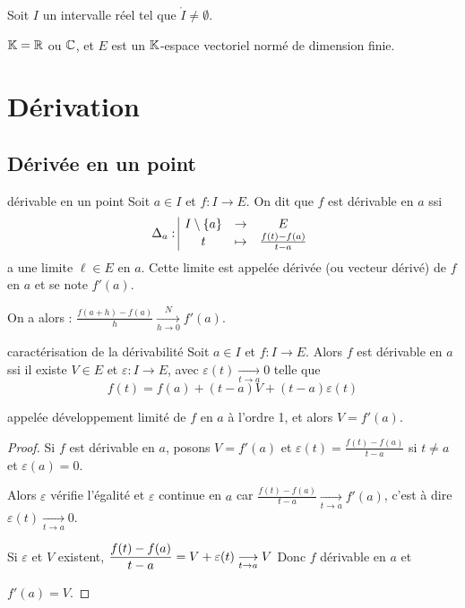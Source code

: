 \documentclass{prepacours}
\begin{document}

\pagedegarde

Soit $I$ un intervalle réel tel que $\mathring{I} \neq \emptyset$.

$\mathbb{K} = \mathbb{R}$ ou $\mathbb{C}$, et $E$ est un $\mathbb{K}$-espace vectoriel normé
 de dimension finie.


\section{Dérivation }
\subsection{Dérivée en un point}

\begin{definition}{dérivable en un point}{}
    Soit $a \in I$ et $f: I \to E$. On dit que $f$ est dérivable en $a$ ssi 
    \[\Delta_a: \space \begin{array}{|ccc} I \setminus \{a\} & \to & E \\ t & \mapsto & \frac{f(t) - f(a)}{t-a} \end{array}\]
    a une limite $\ell \in E$ en $a$. Cette limite est appelée dérivée (ou vecteur dérivé)
    de $f$ en $a$ et se note $f'(a)$.

    On a alors : $\displaystyle \frac{f(a + h ) - f(a)}{h} \xrightarrow[h \to 0]{N} f'(a)$.
\end{definition}

\begin{proposition}{caractérisation de la dérivabilité}{}
    Soit $a \in I$ et $f: I \to E$. Alors $f$ est dérivable en $a$ ssi il existe $V \in E$
    et $\varepsilon : I \to E$, avec $\varepsilon(t) \xrightarrow[t \to a]{} 0$ telle que
    \[f(t) = f(a) + (t-a)V + (t-a)\varepsilon(t)\]

    appelée développement limité de $f$ en $a$ à l'ordre 1, et alors $V = f'(a)$.
\end{proposition}

\begin{proof}
    Si $f$ est dérivable en $a$, posons $V = f'(a)$ et $\varepsilon(t) = \frac{f(t) - f(a)}{t - a }$ si 
    $t \neq a$ et $\varepsilon(a) = 0$. 

    Alors $\varepsilon$ vérifie l'égalité et $\varepsilon$ continue en $a$ car 
    $\displaystyle \frac{f(t) - f(a)}{t-a} \xrightarrow[t \to a]{} f'(a)$, c'est à dire 
    $\varepsilon(t) \xrightarrow[t \to a]{} 0$.


    \svspace Si $\varepsilon$ et $V$ existent, $\displaystyle \frac{f(t) - f(a)}{t-a} = V + \varepsilon(t) \underset{t \to a}{\longrightarrow} V$
    Donc $f$ dérivable en $a$ et 
    
    $f'(a) = V$.
\end{proof}
\end{document}
